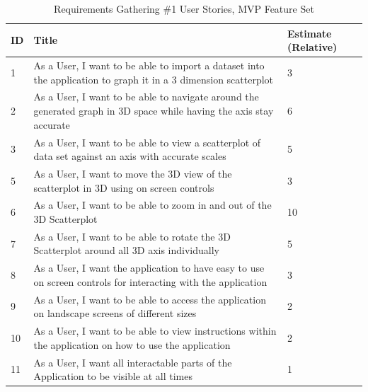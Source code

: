 \begin{table}[t]
    \begin{tabular}{ | l | l | l | }
        \hline
        ID & Title                                                                                                               & Estimate (Relative) \\
        \hline
        1  & As a User, I want to be able to import a dataset into the application to graph it in a 3 dimension scatterplot      & 3                   \\
        \hline
        2  & As a User, I want to be able to navigate around the generated graph in 3D space while having the axis stay accurate & 6                   \\
        \hline
        3  & As a User, I want to be able to view a scatterplot of data set against an axis with accurate scales                 & 5                   \\
        \hline
        5  & As a User, I want to move the 3D view of the scatterplot in 3D using on screen controls                             & 3                   \\
        \hline
        6  & As a User, I want to be able to zoom in and out of the 3D Scatterplot                                               & 10                  \\
        \hline
        7  & As a User, I want to be able to rotate the 3D Scatterplot around all 3D axis individually                           & 5                   \\
        \hline
        8  & As a User, I want the application to have easy to use on screen controls for interacting with the application       & 3                   \\
        \hline
        9  & As a User, I want to be able to access the application on landscape screens of different sizes                      & 2                   \\
        \hline
        10 & As a User, I want to be able to view instructions within the application on how to use the application              & 2                   \\
        \hline
        11 & As a User, I want all interactable parts of the Application to be visible at all times                              & 1                   \\
        \hline
    \end{tabular}
    \caption{Requirements Gathering \#1 User Stories, MVP Feature Set}
    \label{req1}
\end{table}

